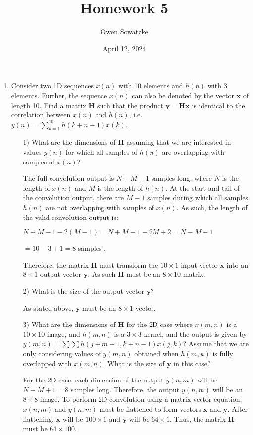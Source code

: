 \documentclass[fleqn]{article}
\title{Homework 5}
\author{Owen Sowatzke}
\date{April 12, 2024}
\newcommand{\zerodisplayskip}{
	\setlength{\abovedisplayskip}{0pt}%
	\setlength{\belowdisplayskip}{0pt}%
	\setlength{\abovedisplayshortskip}{0pt}%
	\setlength{\belowdisplayshortskip}{0pt}%
	\setlength{\mathindent}{0pt}}
\begin{document}
	\offinterlineskip
	\setlength{\lineskip}{12pt}
	\zerodisplayskip
	\maketitle
	
	\begin{enumerate}
		\item Consider two 1D sequences $x(n)$ with 10 elements and $h(n)$ with 3 elements. Further, the sequence $x(n)$ can also be denoted by the vector $\mathbf{x}$ of length 10. Find a matrix $\mathbf{H}$ such that the product $\mathbf{y} = \mathbf{Hx}$ is identical to the correlation between $x(n)$ and $h(n)$, i.e. $y(n) = \sum_{k=1}^{10}{h(k+n-1)x(k)}$.
		
		\begin{enumerate}
			\item [1)] What are the dimensions of $\mathbf{H}$ assuming that we are interested in values $y(n)$ for which all samples of $h(n)$ are overlapping with samples of $x(n)$?
			
			The full convolution output is $N + M - 1$ samples long, where $N$ is the length of $x(n)$ and $M$ is the length of $h(n)$. At the start and tail of the convolution output, there are $M - 1$ samples during which all samples $h(n)$ are not overlapping with samples of $x(n)$. As such, the length of the valid convolution output is:
			
			$N + M - 1 - 2(M - 1) = N + M - 1 - 2M + 2 = N - M + 1$
			
			$ = 10 - 3 + 1 = 8$ samples .
			
			Therefore, the matrix $\mathbf{H}$ must transform the $10 \times 1$ input vector $\mathbf{x}$ into an $8 \times 1$ output vector $\mathbf{y}$.  As such $\mathbf{H}$ must be an $8 \times 10$ matrix.
			
			\item [2)] What is the size of the output vector $\mathbf{y}$?
			
			As stated above, $\mathbf{y}$ must be an $8 \times 1$ vector.
			
			\item [3)] What are the dimensions of $\mathbf{H}$ for the 2D case where $x(m,n)$ is a $10 \times 10$ image, and $h(m,n)$ is a $3 \times 3$ kernel, and the output is given by $y(m,n) = \sum{\sum{h(j+m-1,k+n-1)x(j,k)}}$? Assume that we are only considering values of $y(m,n)$ obtained when $h(m,n)$ is fully overlapped with $x(m,n)$. What is the size of $\mathbf{y}$ in this case?
			
			For the 2D case, each dimension of the output $y(n,m)$ will be $N - M + 1 = 8$ samples long. Therefore, the output $y(n,m)$ will be an $8 \times 8$ image. To perform 2D convolution using a matrix vector equation, $x(n,m)$ and $y(n,m)$ must be flattened to form vectors $\mathbf{x}$ and $\mathbf{y}$. After flattening, $\mathbf{x}$ will be $100 \times 1$ and $\mathbf{y}$ will be $64 \times 1$. Thus, the matrix $\mathbf{H}$ must be $64 \times 100$.
		\end{enumerate}
	\end{enumerate}
\end{document}
